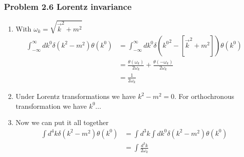 \documentclass[10pt,a4paper]{article}
\theoremstyle{definition}
\begin{document}
\subsubsection{Problem 2.6 Lorentz invariance}
\begin{enumerate}
    \item With $\omega_k=\sqrt{\vec{k}^2+m^2}$
    \begin{align}
        \int_{-\infty}^\infty dk^0\delta(k^2-m^2)\theta(k^0)
        &=\int_{-\infty}^\infty dk^0\delta({k^0}^2-[\vec{k}^2+m^2])\theta(k^0)\\
        &=\frac{\theta(\omega_k)}{2\omega_k}+\frac{\theta(-\omega_k)}{2\omega_k}\\
        &=\frac{1}{2\omega_k}
    \end{align}
    \item Under Lorentz transformations we have $k^2-m^2=0$. For orthochronous transformation we have $k^0 ...$
    \item Now we can put it all together
    \begin{align}
        \int d^4k\delta(k^2-m^2)\theta(k^0)
        &=\int d^3k\int dk^0\delta(k^2-m^2)\theta(k^0)\\
        &=\int\frac{d^3k}{2\omega_k}
    \end{align}
\end{enumerate}
\end{document}
